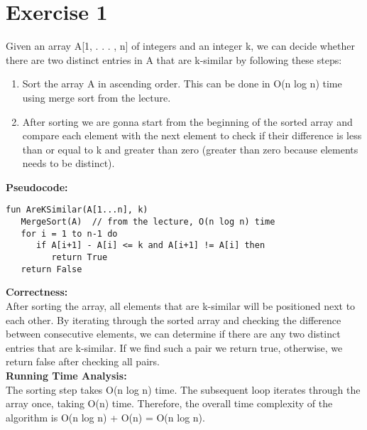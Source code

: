 \documentclass{article}
\begin{document}

\section*{Exercise 1}
Given an array A[1, . . . , n] of integers and an integer k, we can decide whether there are two distinct entries in A that are k-similar by following these steps:
\begin{enumerate}
    \item Sort the array A in ascending order. This can be done in O(n log n) time using merge sort from the lecture.
    \item After sorting we are gonna start from the beginning of the sorted array and compare each element with the next element to check if their difference is less than or equal to k and greater than zero (greater than zero because elements needs to be distinct).
\end{enumerate}
\textbf{Pseudocode:}\\
\begin{verbatim}
fun AreKSimilar(A[1...n], k)
   MergeSort(A)  // from the lecture, O(n log n) time
   for i = 1 to n-1 do
      if A[i+1] - A[i] <= k and A[i+1] != A[i] then
         return True
   return False
\end{verbatim}
\textbf{Correctness:}\\
After sorting the array, all elements that are k-similar will be positioned next to each other. By iterating through the sorted array and checking the difference between consecutive elements, we can determine if there are any two distinct entries that are k-similar. If we find such a pair we return true, otherwise, we return false after checking all pairs.\\
\textbf{Running Time Analysis:}\\
The sorting step takes O(n log n) time. The subsequent loop iterates through the array once, taking O(n) time. Therefore, the overall time complexity of the algorithm is O(n log n) + O(n) = O(n log n).
\end{document}
